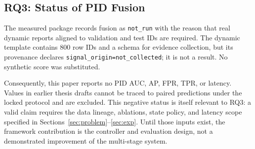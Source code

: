 \subsection{RQ3: Status of PID Fusion}

The measured package records fusion as \texttt{not\_run} with the reason that real
dynamic reports aligned to validation and test IDs are required. The dynamic
template contains 800 row IDs and a schema for evidence collection, but its
provenance declares \texttt{signal\_origin=not\_collected}; it is not a result. No
synthetic score was substituted.

Consequently, this paper reports no PID AUC, AP, FPR, TPR, or latency. Values in
earlier thesis drafts cannot be traced to paired predictions under the locked
protocol and are excluded. This negative status is itself relevant to RQ3: a
valid claim requires the data lineage, ablations, state policy, and latency scope
specified in Sections~\ref{sec:problem}--\ref{sec:exp}. Until those inputs exist,
the framework contribution is the controller and evaluation design, not a
demonstrated improvement of the multi-stage system.
